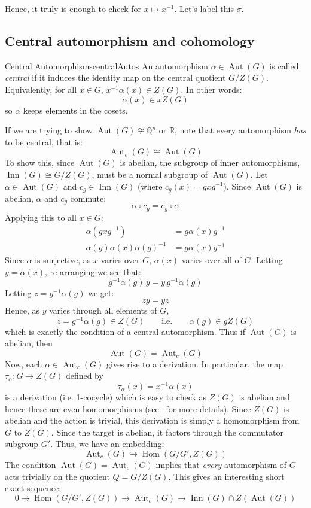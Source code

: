 \documentclass{book}
\newcommand{\Q}{{\mathbb{Q}}}
\newcommand{\R}{{\mathbb{R}}}
\newcommand{\Aut}{{\operatorname{Aut}}}
\newcommand{\Hom}{{\operatorname{Hom}}}
\newcommand{\Inn}{{\operatorname{Inn}}}
\begin{document}
Hence, it truly is enough to check for $x \mapsto x^{-1}$. Let's label this $\sigma$.

\subsection*{Central automorphism and cohomology}

\begin{defn}{Central Automorphisms}{centralAutos}
    An automorphism $\alpha \in \Aut(G)$ is called \emph{central} if it induces the identity map on the
    central quotient $G/Z(G)$. Equivalently, for all $x \in G$, $x^{-1}\alpha(x) \in Z(G)$. In other words:
    \[
      \alpha(x) \in xZ(G)
    \]
    so $\alpha$ keeps elements in the cosets.
\end{defn}

If we are trying to show $\Aut(G) \not\cong \Q^n$ or $\R$, note that every automorphism \emph{has} to be
central, that is:
\[
  \Aut_c(G) \cong \Aut(G)
\]
To show this, since $\Aut(G)$ is abelian, the subgroup of inner automorphisms, $\Inn(G) \cong G/Z(G)$, must be
a normal subgroup of $\Aut(G)$. Let $\alpha \in \Aut(G)$ and $c_g \in \Inn(G)$ (where $c_g(x) = gxg^{-1}$).
Since $\Aut(G)$ is abelian, $\alpha$ and $c_g$ commute:
\[
    \alpha \circ c_g = c_g \circ \alpha
\]
Applying this to all $x \in G$:
\begin{align*}
    \alpha(gxg^{-1}) &= g\alpha(x)g^{-1} \\
    \alpha(g)\alpha(x)\alpha(g)^{-1} &= g\alpha(x)g^{-1}
\end{align*}
Since $\alpha$ is surjective, as $x$ varies over $G$, $\alpha(x)$ varies over all of $G$.  Letting $y
= \alpha(x)$, re-arranging we see that:
\[
  g^{-1} \alpha(g) \, y = y \, g^{-1} \alpha(g)
\]
Letting $z = g^{-1}\alpha(g)$ we get:
\[
  zy = yz
\]
Hence, as $y$ varies through all elements of $G$,
\[
  z = g^{-1}\alpha(g) \in Z(G) \qquad \text{i.e.} \qquad \alpha(g) \in gZ(G)
\]
which is exactly the condition of a central automorphism. Thus if $\Aut(G)$ is abelian, then
\[
  \Aut(G) = \Aut_c(G)
\]
Now, each $\alpha \in \Aut_c(G)$ gives rise to a derivation. In particular, the map $\tau_\alpha: G \to Z(G)$ defined by
\[
  \tau_\alpha(x) = x^{-1}\alpha(x)
\]
is a derivation (i.e. 1-cocycle) which is easy to check as $Z(G)$ is abelian and hence these are even
homomorphisms (see~\cite{NateGaloisCohom} for more details). Since $Z(G)$ is abelian and the action is
trivial, this derivation is simply a homomorphism from $G$ to $Z(G)$. Since the target is abelian,
it factors through the commutator subgroup $G'$. Thus, we have an embedding:
\[
    \Aut_c(G) \hookrightarrow \Hom(G/G', Z(G))
\]
The condition $\Aut(G) = \Aut_c(G)$ implies that \emph{every} automorphism of $G$ acts trivially on the
quotient $Q = G/Z(G)$. This gives an interesting short exact sequence:
\[
  0 \to \Hom(G/G', Z(G)) \to \Aut_c(G) \to \Inn(G) \cap Z(\Aut(G))
\]
\end{document}
